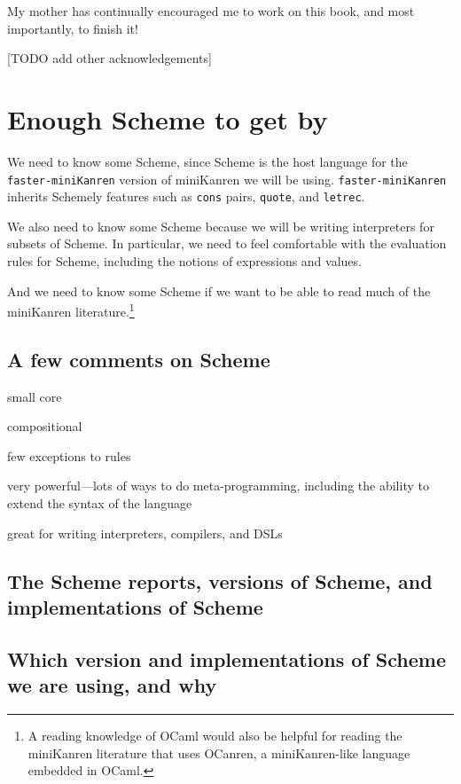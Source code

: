 \documentclass{book}
\begin{document}
My mother has continually encouraged me to work on this book, and most importantly, to finish it!

[TODO add other acknowledgements]


\mainmatter

\chapter{Enough Scheme to get by} %

We need to know some Scheme, since Scheme is the host language for the \texttt{faster-miniKanren} version of miniKanren we will be using. \texttt{faster-miniKanren} inherits Schemely features such as \texttt{cons} pairs, \texttt{quote}, and \texttt{letrec}.

We also need to know some Scheme because we will be writing interpreters for subsets of Scheme.  In particular, we need to feel comfortable with the evaluation rules for Scheme, including the notions of expressions and values.

And we need to know some Scheme if we want to be able to read much of the miniKanren literature.\footnote{A reading knowledge of OCaml would also be helpful for reading the miniKanren literature that uses OCanren, a miniKanren-like language embedded in OCaml.}

\section{A few comments on Scheme}

small core

compositional

few exceptions to rules

very powerful---lots of ways to do meta-programming, including the
ability to extend the syntax of the language

great for writing interpreters, compilers, and DSLs

\section{The Scheme reports, versions of Scheme, and implementations of Scheme}

\section{Which version and implementations of Scheme we are using, and why}
\end{document}
